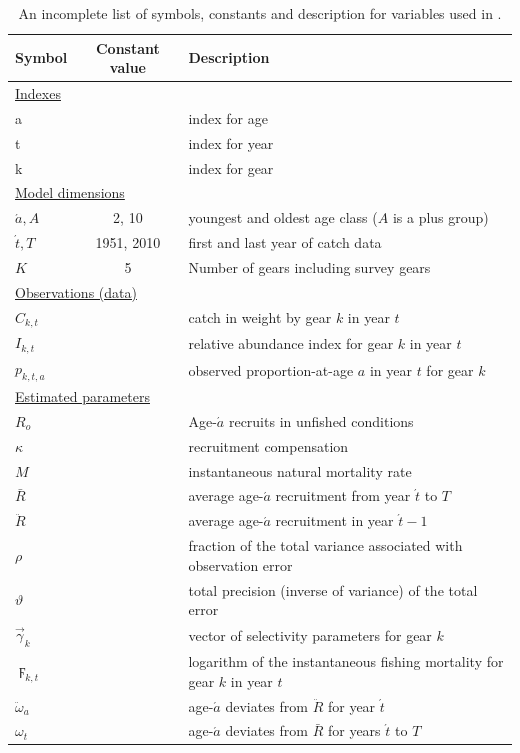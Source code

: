 \begin{table}[htdp]
\caption{An incomplete list of symbols, constants and description for variables used in \iscam.}\label{TableSymbols}
\begin{center}
\begin{tabular}{lcl}
\hline
Symbol & Constant value & Description\\
\hline
\multicolumn{3}{l}{\underline{Indexes}}\\
a & & index for age\\
t & & index for year\\
k & & index for gear\\
\multicolumn{3}{l}{\underline{Model dimensions}}\\
$\acute{a}, A$ & 2, 10& youngest and oldest age class ($A$ is a plus group)\\
$\acute{t}, T$ & 1951, 2010 & first and last year of catch data\\
$K$ & 5 & Number of gears including survey gears\\
\multicolumn{3}{l}{\underline{Observations (data)}}\\
$C_{k,t}$ & & catch in weight by gear $k$ in year $t$\\
$I_{k,t}$ & & relative abundance index for gear $k$ in year $t$\\
$p_{k,t,a}$& & observed proportion-at-age $a$ in year $t$ for gear $k$\\
\multicolumn{3}{l}{\underline{Estimated parameters}}\\
$R_o$ & & Age-$\acute{a}$ recruits in unfished conditions\\
$\kappa$ & & recruitment compensation\\
$M$ & & instantaneous natural mortality rate \\
$\bar{R}$ & & average age-$\acute{a}$ recruitment from year $\acute{t}$ to $T$\\
$\ddot{R}$ & & average age-$\acute{a}$ recruitment in year $\acute{t}-1$\\
$\rho$ & & fraction of the total variance associated with observation error\\
$\vartheta$ & & total precision (inverse of variance) of the total error\\
$\vec{\gamma}_k$ & & vector of selectivity parameters for gear $k$\\
$\digamma_{k,t}$ & & logarithm of the instantaneous fishing mortality for gear $k$ in year $t$\\
$\ddot{\omega}_a$&& age-$\acute{a}$ deviates from $\ddot{R}$ for year $\acute{t}$\\
$\omega_t$&& age-$\acute{a}$ deviates from $\bar{R}$ for years $\acute{t}$ to $T$\\
\hline \hline
\end{tabular}
\end{center}
\end{table}%


